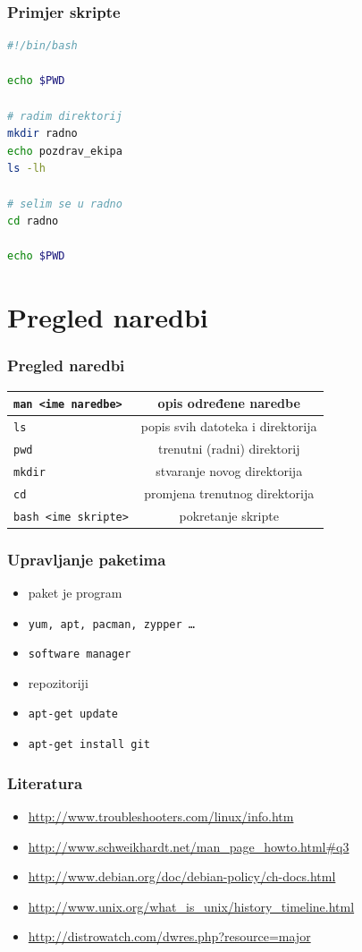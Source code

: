 \documentclass{beamer}
\newcommand{\shell}[1]{\texttt{#1}}
\begin{document}
\begin{frame}[fragile]
\frametitle{Primjer skripte}
\begin{lstlisting}[language=bash]
#!/bin/bash

echo $PWD

# radim direktorij
mkdir radno
echo pozdrav_ekipa
ls -lh

# selim se u radno
cd radno

echo $PWD
\end{lstlisting}
\end{frame}

\section{Pregled naredbi}
\begin{frame}[t]
\frametitle{Pregled naredbi}
\begin{tabular}{| l | c |} \hline
  \shell{man <ime naredbe>} & opis određene naredbe \\ \hline
  \shell{ls} & popis svih datoteka i direktorija \\ \hline
  \shell{pwd} & trenutni (radni) direktorij \\ \hline
  \shell {mkdir} & stvaranje novog direktorija \\ \hline
  \shell{cd} & promjena trenutnog direktorija \\ \hline
  \shell{bash <ime skripte>} & pokretanje skripte \\ \hline

\end{tabular}
\end{frame}

\begin{frame}[t]
\frametitle{Upravljanje paketima}
\begin{itemize}
  \item paket je program
  \item \texttt{yum, apt, pacman, zypper \ldots}
  \item \texttt{software manager}
  \item repozitoriji
  \item \texttt{apt-get update}
  \item \texttt{apt-get install git}
\end{itemize}
\end{frame}

\begin{frame}[t]
\frametitle{Literatura}
\begin{itemize}
  \item \url{http://www.troubleshooters.com/linux/info.htm}
  \item \url{http://www.schweikhardt.net/man_page_howto.html\#q3}
  \item \url{http://www.debian.org/doc/debian-policy/ch-docs.html}
  \item \url{http://www.unix.org/what_is_unix/history_timeline.html}
  \item \url{http://distrowatch.com/dwres.php?resource=major}
\end{itemize}
\end{frame}
\end{document}

